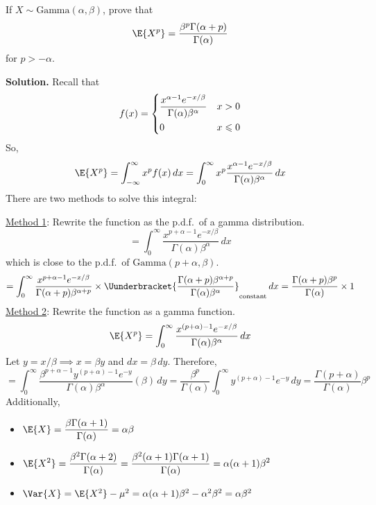 \begin{Example}{}{}
    If $ X \sim \text{Gamma}(\alpha,\beta) $, prove that
    \[ \E{X^p}=\frac{\beta^p\Gamma(\alpha+p)}{\Gamma(\alpha)}  \]
    for $ p>-\alpha $.

    \textbf{Solution.} Recall that
    \[ f(x)=\begin{dcases}
            \frac{x^{\alpha-1}e^{-x/\beta}}{\Gamma(\alpha)\beta^\alpha} & x>0          \\
            0                                                           & x\leqslant 0
        \end{dcases} \]
    So,
    \[ \E{X^p}=\int_{-\infty}^{\infty} x^p f(x)\, d{x}
        =\int_{0}^{\infty} x^p \frac{x^{\alpha-1}e^{-x/\beta}}{\Gamma(\alpha)\beta^\alpha}\, d{x}
    \]
    There are two methods to solve this integral:

    \underline{Method 1}: Rewrite the function as the p.d.f.\ of a gamma
    distribution.
    \[ =\int_{0}^{\infty} \frac{x^{p+\alpha-1}e^{-x/\beta}}{\Gamma(\alpha)\beta^\alpha} \, d{x}  \]
    which is close to the p.d.f.\ of $ \text{Gamma}(p+\alpha,\beta) $.
    \[ =\int_{0}^{\infty} \frac{x^{p+\alpha-1}e^{-x/\beta}}{\Gamma(\alpha+p)\beta^{\alpha+p}}\times
        \Uunderbracket{\frac{\Gamma(\alpha+p)\beta^{\alpha+p}}{\Gamma(\alpha)\beta^\alpha}}_{\text{constant}}  \, d{x}=
        \frac{\Gamma(\alpha+p)\beta^p}{\Gamma(\alpha)}\times 1   \]
    \underline{Method 2}: Rewrite the function as a gamma function.
    \[ \E{X^p}=\int_{0}^{\infty} \frac{x^{(p+\alpha)-1} e^{-x/\beta}}{\Gamma(\alpha)\beta^\alpha} \, d{x} \]
    Let $ y=x/\beta \implies x=\beta y$ and $ dx=\beta\,dy $. Therefore,
    \[ =\int_{0}^{\infty} \frac{\beta^{p+\alpha-1}y^{(p+\alpha)-1}e^{-y}}{\Gamma(\alpha)\beta^\alpha} (\beta)\, d{y}
        =\frac{\beta^p}{\Gamma(\alpha)}\int_{0}^{\infty} y^{(p+\alpha)-1}e^{-y}\, d{y}
        =\frac{\Gamma(p+\alpha)}{\Gamma(\alpha)}\beta^p     \]
    Additionally,
    \begin{itemize}
        \item $ \displaystyle \E{X}= \frac{\beta\Gamma(\alpha+1)}{\Gamma(\alpha)} =\alpha\beta $
        \item $ \displaystyle \E{X^2}= \frac{\beta^2\Gamma(\alpha+2)}{\Gamma(\alpha)}=\frac{\beta^2(\alpha+1)\Gamma(\alpha+1)}{\Gamma(\alpha)}=
                  \alpha(\alpha+1)\beta^2   $
        \item $ \Var{X}=\E{X^2}-\mu^2=\alpha(\alpha+1)\beta^2-\alpha^2\beta^2=\alpha\beta^2 $
    \end{itemize}
\end{Example}
\setcounter{section}{9}
